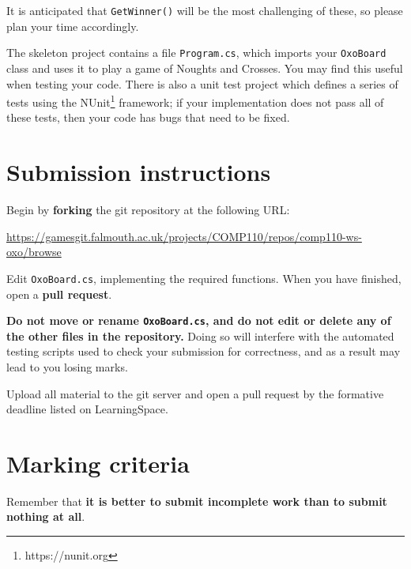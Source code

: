 \documentclass{../../../fal_assignment}
\begin{document}
It is anticipated that \lstinline{GetWinner()} will be the most challenging of these,
so please plan your time accordingly.

The skeleton project contains a file \texttt{Program.cs}, which imports your \lstinline{OxoBoard} class
and uses it to play a game of Noughts and Crosses. You may find this useful when testing your code.
There is also a unit test project which defines a series of tests using the NUnit\footnote{https://nunit.org} framework;
if your implementation does not pass all of these tests, then your code has bugs that need to be fixed.

\section*{Submission instructions}

Begin by \textbf{forking} the git repository at the following URL:

\url{https://gamesgit.falmouth.ac.uk/projects/COMP110/repos/comp110-ws-oxo/browse}

Edit \texttt{OxoBoard.cs}, implementing the required functions.
When you have finished, open a \textbf{pull request}.

\textbf{Do not move or rename \texttt{OxoBoard.cs}, and do not edit or delete any of the other files in the repository.}
Doing so will interfere with the automated testing scripts used to check your submission for correctness,
and as a result may lead to you losing marks.

Upload all material to the git server and open a pull request by the formative deadline listed on LearningSpace.

\section*{Marking criteria}

Remember that \textbf{it is better to submit incomplete work than to submit nothing at all}.
\end{document}
